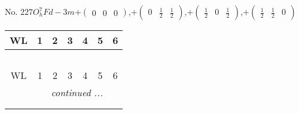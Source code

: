 \documentclass[fleqn,9pt,landscape]{jsarticle}
\begin{document}
\newpage
No. 227\quad$O_{h}^{7}$\quad$Fd-3m$\quad[ cubic ]\quad$+\begin{pmatrix} 0 & 0 & 0 \end{pmatrix}$,\quad $+\begin{pmatrix} 0 & \frac{1}{2} & \frac{1}{2} \end{pmatrix}$,\quad $+\begin{pmatrix} \frac{1}{2} & 0 & \frac{1}{2} \end{pmatrix}$,\quad $+\begin{pmatrix} \frac{1}{2} & \frac{1}{2} & 0 \end{pmatrix}$
\begin{center}
\renewcommand{\arraystretch}{1.2}
\begin{longtable}{ccccccc}
 \hline \hline
WL & 1 & 2 & 3 & 4 & 5 & 6 \\ \hline \endfirsthead

\multicolumn{6}{l}{\tablename\ \thetable{}} \\
 \hline \hline
WL & 1 & 2 & 3 & 4 & 5 & 6 \\ \hline \endhead

 \hline \hline
\multicolumn{6}{r}{\footnotesize\it continued ...} \\ \endfoot

 \hline \hline
\multicolumn{6}{r}{} \\ \endlastfoot


\end{longtable}
\end{center}
\end{document}
